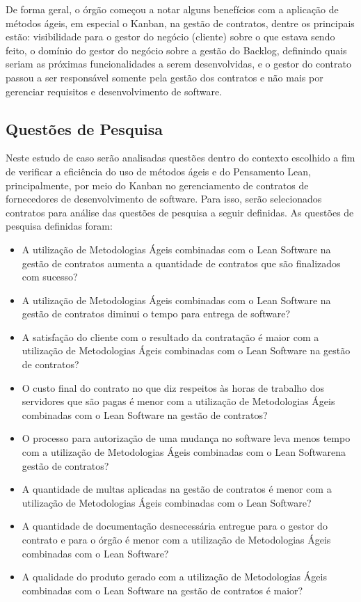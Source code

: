 De forma geral, o órgão começou a notar alguns benefícios com a aplicação de métodos ágeis, em especial o Kanban, na gestão de contratos, dentre os principais estão: visibilidade para o gestor do negócio (cliente) sobre o que estava sendo feito, o domínio do gestor do negócio sobre a gestão do Backlog, definindo quais seriam as próximas funcionalidades a serem desenvolvidas, e o gestor do contrato passou a ser responsável somente pela gestão dos contratos e não mais por gerenciar requisitos e desenvolvimento de software.


\subsection[Questões de Pesquisa]{Questões de Pesquisa}

Neste estudo de caso serão analisadas questões dentro do contexto escolhido a fim de verificar a eficiência do uso de métodos ágeis e do Pensamento Lean, principalmente, por meio do Kanban no gerenciamento de contratos de fornecedores de desenvolvimento de software. Para isso, serão selecionados contratos para análise das questões de pesquisa a seguir definidas. As questões de pesquisa definidas foram:
\begin{itemize}
\item  A utilização de Metodologias Ágeis combinadas com o Lean Software na gestão de contratos aumenta a quantidade de contratos que são finalizados com sucesso?
\item  A utilização de Metodologias Ágeis combinadas com o Lean Software na gestão de contratos diminui o tempo para entrega de software?
\item	A satisfação do cliente com o resultado da contratação é maior com a utilização de Metodologias Ágeis combinadas com o Lean Software na gestão de contratos?
\item  O custo final do contrato no que diz respeitos às horas de trabalho dos servidores que são pagas é menor com a utilização de Metodologias Ágeis combinadas com o Lean Software na gestão de contratos?
\item  O processo para autorização de uma mudança no software leva menos tempo com a utilização de Metodologias Ágeis combinadas com o Lean Softwarena gestão de contratos?
\item	A quantidade de multas aplicadas na gestão de contratos é menor com a utilização de Metodologias Ágeis combinadas com o Lean Software?
\item	A quantidade de documentação desnecessária entregue para o gestor do contrato e para o órgão é menor com a utilização de Metodologias Ágeis combinadas com o Lean Software?
\item  A qualidade do produto gerado com a utilização de Metodologias Ágeis combinadas com o Lean Software na gestão de contratos é maior?
\end{itemize}

